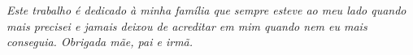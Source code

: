 \begin{dedicatoria}
   \vspace*{\fill}
   \centering
   \noindent

   \textit{ Este trabalho é dedicado à minha família que sempre esteve ao meu lado quando mais precisei e jamais deixou de acreditar em mim quando nem eu mais conseguia. Obrigada mãe, pai e irmã. }
   
   \vspace*{\fill}
\end{dedicatoria}